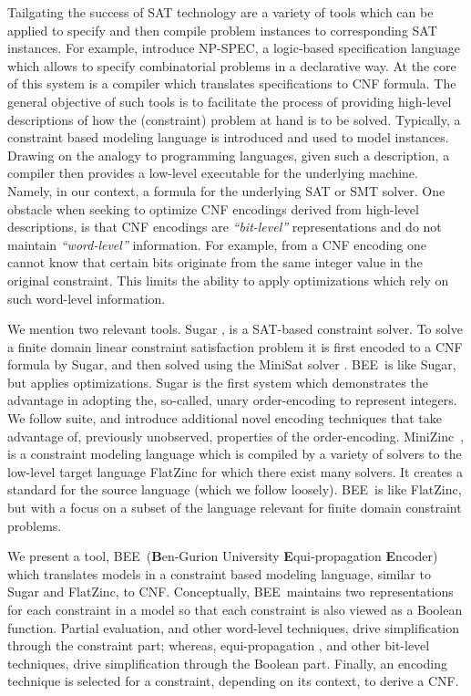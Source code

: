 \documentclass{tlp}
\newcommand{\bee}{\textsf{BEE}}
\begin{document}
Tailgating the success of SAT technology are a variety of tools which
can be applied to specify and then compile problem instances to
corresponding SAT instances. 
For example,  introduce \textsf{NP-SPEC}, a
logic-based specification language which allows to specify
combinatorial problems in a declarative way. At the core of this
system is a compiler which translates specifications to CNF formula.
The general objective of such tools is to facilitate the process of
providing high-level descriptions of how the (constraint) problem at
hand is to be solved.  Typically, a constraint based modeling language
is introduced and used to model instances.  Drawing on the analogy
to programming languages, given such a description, a
compiler then provides a low-level executable for the underlying
machine. Namely, in our context, a formula for the underlying SAT or
SMT solver.
One obstacle when seeking to optimize CNF encodings derived from
high-level descriptions, is that CNF encodings are
\textit{``bit-level''} representations and do not maintain
\textit{``word-level''} information. For example, from a CNF encoding
one cannot know that certain bits originate from the same integer
value in the original constraint. This limits the ability to apply
optimizations which rely on such word-level information.


We mention two relevant tools.
Sugar \cite{sugar2009}, is a SAT-based constraint solver. To solve a
finite domain linear constraint satisfaction problem it is first
encoded to a CNF formula by Sugar, and then solved using the MiniSat
solver \cite{minisat2003}. \bee\ is like Sugar, but applies
optimizations. Sugar is the first system which demonstrates the
advantage in adopting the, so-called, unary order-encoding to
represent integers.  We follow suite, and introduce additional novel
encoding techniques that take advantage of, previously unobserved,
properties of the order-encoding.
MiniZinc~\cite{miniZinc2007}, is a constraint modeling language which
is compiled by a variety of solvers to the low-level target language
FlatZinc for which there exist many solvers. It creates a standard for
the source language (which we follow loosely).  \bee\ is like FlatZinc,
but with a focus on a subset of the language relevant for finite
domain constraint problems.



We present a tool, \bee\ {\small (\textbf{\textsf{B}}en-Gurion
  University \textbf{\textsf{E}}qui-propagation
  \textbf{\textsf{E}}ncoder)} which translates models in a constraint
based modeling language, similar to Sugar and FlatZinc, to CNF.
Conceptually, \bee\ maintains two representations for each constraint
in a model so that each constraint is also viewed as a Boolean
function. Partial evaluation, and other word-level techniques, drive
simplification through the constraint part; whereas, equi-propagation
\cite{Metodi2011}, and other bit-level techniques, drive
simplification through the Boolean part.
Finally, an encoding technique is selected for a constraint, depending
on its context, to derive a CNF.
\end{document}
